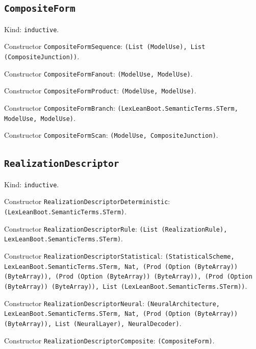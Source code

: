 \documentclass[11pt]{article}
\begin{document}
\subsection*{\texttt{CompositeForm}}
\noindent Kind: \texttt{inductive}.\par
\noindent Constructor \texttt{CompositeFormSequence}: \texttt{(List (ModelUse), List (CompositeJunction))}.\par
\noindent Constructor \texttt{CompositeFormFanout}: \texttt{(ModelUse, ModelUse)}.\par
\noindent Constructor \texttt{CompositeFormProduct}: \texttt{(ModelUse, ModelUse)}.\par
\noindent Constructor \texttt{CompositeFormBranch}: \texttt{(LexLeanBoot.SemanticTerms.STerm, ModelUse, ModelUse)}.\par
\noindent Constructor \texttt{CompositeFormScan}: \texttt{(ModelUse, CompositeJunction)}.\par
\subsection*{\texttt{RealizationDescriptor}}
\noindent Kind: \texttt{inductive}.\par
\noindent Constructor \texttt{RealizationDescriptorDeterministic}: \texttt{(LexLeanBoot.SemanticTerms.STerm)}.\par
\noindent Constructor \texttt{RealizationDescriptorRule}: \texttt{(List (RealizationRule), LexLeanBoot.SemanticTerms.STerm)}.\par
\noindent Constructor \texttt{RealizationDescriptorStatistical}: \texttt{(StatisticalScheme, LexLeanBoot.SemanticTerms.STerm, Nat, (Prod (Option (ByteArray)) (ByteArray)), (Prod (Option (ByteArray)) (ByteArray)), (Prod (Option (ByteArray)) (ByteArray)), List (LexLeanBoot.SemanticTerms.STerm))}.\par
\noindent Constructor \texttt{RealizationDescriptorNeural}: \texttt{(NeuralArchitecture, LexLeanBoot.SemanticTerms.STerm, Nat, (Prod (Option (ByteArray)) (ByteArray)), List (NeuralLayer), NeuralDecoder)}.\par
\noindent Constructor \texttt{RealizationDescriptorComposite}: \texttt{(CompositeForm)}.\par
\end{document}
